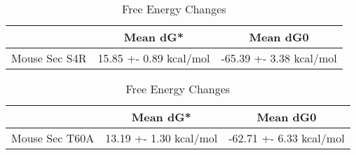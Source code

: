                                                               \begin{table}[ht]
                                                                \centering
                                                                \begin{tabular}{|c|c|c|}
                                                                \hline
                                                                  & Mean dG* & Mean dG0 \\
                                                                \hline
                                                                Mouse Sec  S4R & 15.85 +- 0.89 kcal/mol & -65.39 +- 3.38 kcal/mol \\
                                                                \hline
                                                                \end{tabular}
                                                                \caption{Free Energy Changes}
                                                                \end{table}
                                                              
                                                              \begin{table}[ht]
                                                                \centering
                                                                \begin{tabular}{|c|c|c|}
                                                                \hline
                                                                  & Mean dG* & Mean dG0 \\
                                                                \hline
                                                                Mouse Sec  T60A & 13.19 +- 1.30 kcal/mol & -62.71 +- 6.33 kcal/mol \\
                                                                \hline
                                                                \end{tabular}
                                                                \caption{Free Energy Changes}
                                                                \end{table}

